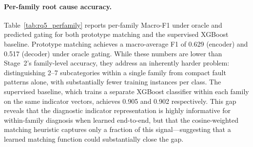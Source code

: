 \paragraph{Per-family root cause accuracy.}
Table~\ref{tab:rq5_perfamily} reports per-family Macro-F1 under oracle and predicted gating for both prototype matching and the supervised XGBoost baseline. Prototype matching achieves a macro-average F1 of 0.629 (encoder) and 0.517 (decoder) under oracle gating. While these numbers are lower than Stage~2's family-level accuracy, they address an inherently harder problem: distinguishing 2--7 subcategories within a single family from compact fault patterns alone, with substantially fewer training instances per class. The supervised baseline, which trains a separate XGBoost classifier within each family on the same indicator vectors, achieves 0.905 and 0.902 respectively. This gap reveals that the diagnostic indicator representation is highly informative for within-family diagnosis when learned end-to-end, but that the cosine-weighted matching heuristic captures only a fraction of this signal---suggesting that a learned matching function could substantially close the gap.

